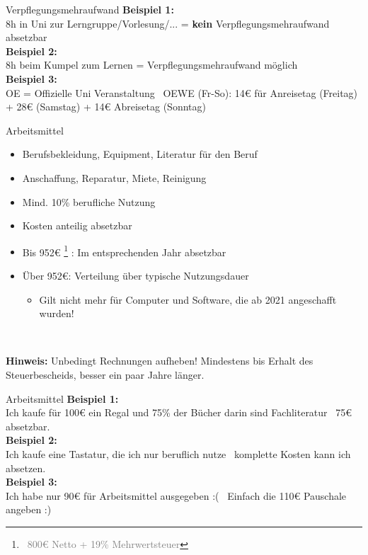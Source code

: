 \documentclass{beamer}
\newcommand{\n}{\hfill\\\vspace{0.25cm}}
\let\oldfootnote\footnote
\renewcommand{\footnote}[1]
{%
	\oldfootnote
	{
		\tiny
		\textcolor{gray}{\ #1}
	}%
}
\begin{document}
			\begin{frame}{Verpflegungsmehraufwand}
				\textbf{Beispiel 1:}\\
				8h in Uni zur Lerngruppe/Vorlesung/... = \textbf{kein} Verpflegungsmehraufwand absetzbar\n\pause
				\textbf{Beispiel 2:}\\
				8h beim Kumpel zum Lernen = Verpflegungsmehraufwand möglich\n\pause
				\textbf{Beispiel 3:}\\
				OE = Offizielle Uni Veranstaltung \textrightarrow\ OEWE (Fr-So): 14€ für Anreisetag (Freitag) + 28€ (Samstag) + 14€ Abreisetag (Sonntag)
			\end{frame}
		
			\begin{frame}{Arbeitsmittel}
				\begin{itemize}
					\item Berufsbekleidung, Equipment, Literatur für den Beruf
					\item Anschaffung, Reparatur, Miete, Reinigung
					\item Mind. 10\% berufliche Nutzung
					\item Kosten anteilig absetzbar
					\item Bis 952€\footnote{800€ Netto + 19\% Mehrwertsteuer}: Im entsprechenden Jahr absetzbar
					\item Über 952€: Verteilung über typische Nutzungsdauer
					\begin{itemize}
						\item Gilt nicht mehr für Computer und Software, die ab 2021 angeschafft wurden!
					\end{itemize}
				\end{itemize}\n\pause
			
				\textbf{Hinweis:} Unbedingt Rechnungen aufheben! Mindestens bis Erhalt des Steuerbescheids, besser ein paar Jahre länger.
			\end{frame}
		
			\begin{frame}{Arbeitsmittel}
				\textbf{Beispiel 1:}\\
				Ich kaufe für 100€ ein Regal und 75\% der Bücher darin sind Fachliteratur \textrightarrow\ 75€ absetzbar.\n\pause
				\textbf{Beispiel 2:}\\
				Ich kaufe eine Tastatur, die ich nur beruflich nutze \textrightarrow\ komplette Kosten kann ich absetzen.\n\pause
				\textbf{Beispiel 3:}\\
				Ich habe nur 90€ für Arbeitsmittel ausgegeben :( \textrightarrow\ Einfach die 110€ Pauschale angeben :)
			\end{frame}
		
\end{document}
